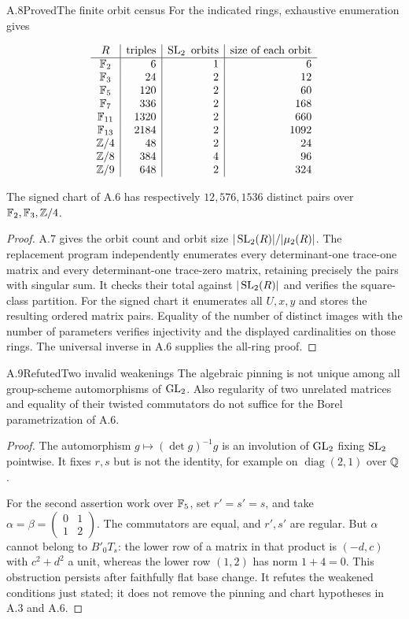 \begin{statement}{A.8}{Proved}{The finite orbit census}
For the indicated rings, exhaustive enumeration gives

$$
\begin{array}{c|r|r|r}
R&\text{triples}&\operatorname{SL}_2\text{ orbits}&\text{size of each orbit}\\\hline
\mathbb F_2&6&1&6\\
\mathbb F_3&24&2&12\\
\mathbb F_5&120&2&60\\
\mathbb F_7&336&2&168\\
\mathbb F_{11}&1320&2&660\\
\mathbb F_{13}&2184&2&1092\\
\mathbb Z/4&48&2&24\\
\mathbb Z/8&384&4&96\\
\mathbb Z/9&648&2&324
\end{array}
$$

The signed chart of A.6 has respectively $12,576,1536$
distinct pairs over $\mathbb F_2,\mathbb F_3,\mathbb Z/4$.
\end{statement}
\begin{proof}
A.7 gives the orbit count and orbit size
$|\operatorname{SL}_2(R)|/|\mu_2(R)|$. The replacement program independently
enumerates every determinant-one trace-one matrix and every
determinant-one trace-zero matrix, retaining precisely the
pairs with singular sum. It checks their total against
$|\operatorname{SL}_2(R)|$ and verifies the square-class partition.
For the signed chart it enumerates all $U,x,y$ and stores
the resulting ordered matrix pairs. Equality of the number
of distinct images with the number of parameters verifies
injectivity and the displayed cardinalities on those rings.
The universal inverse in A.6 supplies the all-ring proof.
\end{proof}

\begin{statement}{A.9}{Refuted}{Two invalid weakenings}
The algebraic pinning is not unique among all group-scheme
automorphisms of $\operatorname{GL}_2$. Also regularity of two unrelated
matrices and equality of their twisted commutators do not
suffice for the Borel parametrization of A.6.
\end{statement}
\begin{proof}
The automorphism
$g\mapsto(\det g)^{-1}g$ is an involution of $\operatorname{GL}_2$ fixing
$\operatorname{SL}_2$ pointwise. It fixes $r,s$ but is not the identity,
for example on $\operatorname{diag}(2,1)$ over $\mathbb Q$.

For the second assertion work over $\mathbb F_5$, set $r'=s'=s$,
and take
$\alpha=\beta=\left(\begin{smallmatrix}0&1\\1&2\end{smallmatrix}\right)$.
The commutators are equal, and $r',s'$ are regular.
But $\alpha$ cannot belong to $B'_0T_s$: the lower row of
a matrix in that product is $(-d,c)$ with $c^2+d^2$ a unit,
whereas the lower row $(1,2)$ has norm $1+4=0$.
This obstruction persists after faithfully flat base change.
It refutes the weakened conditions just stated; it does not
remove the pinning and chart hypotheses in A.3 and A.6.
\end{proof}

